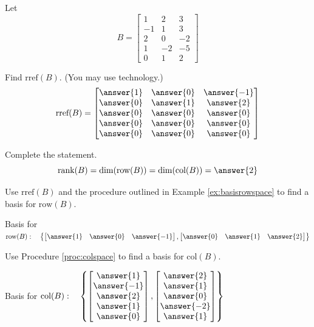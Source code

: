 \documentclass{ximera}
\begin{document}
\begin{problem}\label{prob:colrowmatrixB1}
Let
$$B=\begin{bmatrix}1&2&3\\-1&1&3\\2&0&-2\\1&-2&-5\\0&1&2\end{bmatrix}$$
\begin{question}
Find $\mbox{rref}(B)$. (You may use technology.)
$$\mbox{rref}(B)=\begin{bmatrix}\answer{1}&\answer{0}&\answer{-1}\\\answer{0}&\answer{1}&\answer{2}\\\answer{0}&\answer{0}&\answer{0}\\\answer{0}&\answer{0}&\answer{0}\\\answer{0}&\answer{0}&\answer{0}\end{bmatrix}$$
\end{question}

\begin{question} Complete the statement.
    $$\mbox{rank}(B)=\mbox{dim}(\mbox{row}(B))=\mbox{dim}(\mbox{col}(B))=\answer{2}$$
\end{question}

\begin{question}
    Use $\mbox{rref}(B)$ and the procedure outlined in Example \ref{ex:basisrowspace} to find a basis for $\mbox{row}(B)$.

Basis for $\mbox{row}(B):\quad
\left\{\begin{bmatrix}\answer{1}& \answer{0}& \answer{-1}\end{bmatrix},\begin{bmatrix}\answer{0} & \answer{1}& \answer{2}\end{bmatrix} \right\}$
\end{question}

\begin{question}
    Use Procedure \ref{proc:colspace} to find a basis for $\mbox{col}(B)$.

Basis for $\mbox{col}(B):\quad
\left\{ \begin{bmatrix}\answer{1}\\\answer{-1}\\\answer{2}\\\answer{1}\\\answer{0}\end{bmatrix}, \begin{bmatrix}\answer{2}\\\answer{1}\\\answer{0}\\\answer{-2}\\\answer{1}\end{bmatrix}\right\}$
\end{question}


\end{problem}
\end{document}
